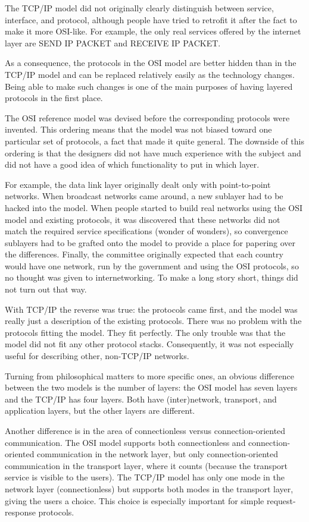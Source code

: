 The TCP/IP model did not originally clearly distinguish between service,
interface, and protocol, although people have tried to retrofit it after
the fact to make it more OSI-like. For example, the only real services
offered by the internet layer are SEND IP PACKET and RECEIVE IP PACKET.

As a consequence, the protocols in the OSI model are better hidden than
in the TCP/IP model and can be replaced relatively easily as the
technology changes. Being able to make such changes is one of the main
purposes of having layered protocols in the first place.

The OSI reference model was devised {before} the corresponding protocols
were invented. This ordering means that the model was not biased toward
one particular set of protocols, a fact that made it quite general. The
downside of this ordering is that the designers did not have much
experience with the subject and did not have a good idea of which
functionality to put in which layer.

For example, the data link layer originally dealt only with
point-to-point networks. When broadcast networks came around, a new
sublayer had to be hacked into the model. When people started to build
real networks using the OSI model and existing protocols, it was
discovered that these networks did not match the required service
specifications (wonder of wonders), so convergence sublayers had to be
grafted onto the model to provide a place for papering over the
differences. Finally, the committee originally expected that each
country would have one network, run by the government and using the OSI
protocols, so no thought was given to internetworking. To make a long
story short, things did not turn out that way.

With TCP/IP the reverse was true: the protocols came first, and the
model was really just a description of the existing protocols. There was
no problem with the protocols fitting the model. They fit perfectly. The
only trouble was that the {model} did not fit any other protocol stacks.
Consequently, it was not especially useful for describing other,
non-TCP/IP networks.

Turning from philosophical matters to more specific ones, an obvious
difference between the two models is the number of layers: the OSI model
has seven layers and the TCP/IP has four layers. Both have
(inter)network, transport, and application layers, but the other layers
are different.

Another difference is in the area of connectionless versus
connection-oriented communication. The OSI model supports both
connectionless and connection-oriented communication in the network
layer, but only connection-oriented communication in the transport
layer, where it counts (because the transport service is visible to the
users). The TCP/IP model has only one mode in the network layer
(connectionless) but supports both modes in the transport layer, giving
the users a choice. This choice is especially important for simple
request-response protocols.



